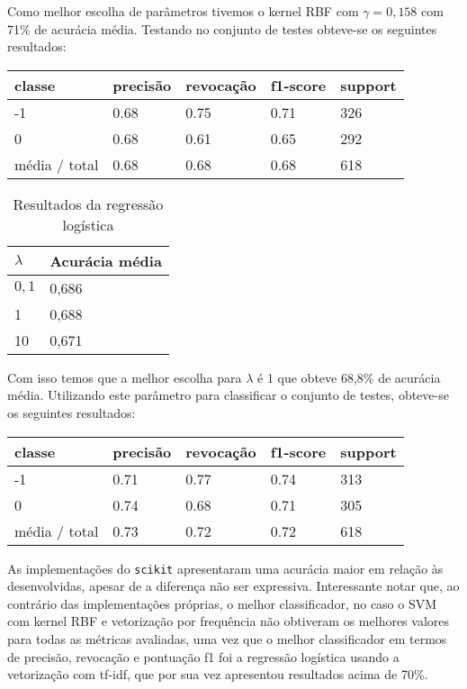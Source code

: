 Como melhor escolha de parâmetros tivemos o kernel RBF com $\gamma = 0,158$ com 71\% de
acurácia média. Testando no conjunto de testes obteve-se os seguintes resultados:

\begin{table}[H]
	\centering
		\begin{tabular}{l | l | l | l | l}
		\hline
		classe  	&	precisão  &  revocação &  f1-score &  support \\
		\hline
		 -1    &   0.68   &   0.75   &   0.71   &    326 \\
		 \hline
          0    &   0.68   &   0.61   &   0.65   &    292 \\
		\hline
		média / total   &    0.68   &   0.68   &   0.68   &    618 \\
		\hline
	\end{tabular}
\end{table}

\begin{table}[H]
	\centering
	\caption{Resultados da regressão logística}
	\begin{tabular}{l l}
		\hline
		$\lambda$ & Acurácia média \\
		\hline
		$0,1$ & 0,686 \\
		\hline
		1 & 0,688 \\
		\hline
		10 & 0,671 \\
	\end{tabular}
\end{table}


Com isso temos que a melhor escolha para $\lambda$ é 1 que obteve 68,8\% de acurácia média.
Utilizando este parâmetro para classificar o conjunto de testes, obteve-se os seguintes resultados:

\begin{table}[H]
	\centering
		\begin{tabular}{l | l | l | l | l}
		\hline
		classe  	&	precisão  &  revocação &  f1-score &  support \\
		\hline
		 -1    &   0.71   &   0.77   &   0.74   &    313 \\
		 \hline
          0    &   0.74   &   0.68   &   0.71   &    305 \\
		\hline
		média / total   &    0.73   &   0.72   &   0.72   &    618 \\
		\hline
	\end{tabular}
\end{table}

As implementações do \texttt{scikit} apresentaram uma acurácia maior em relação às
desenvolvidas, apesar de a diferença não ser expressiva. Interessante notar que,
ao contrário das implementações próprias, o melhor classificador, no caso o SVM
com kernel RBF e vetorização por frequência não obtiveram os melhores valores para
todas as métricas avaliadas, uma vez que o melhor classificador em termos de
precisão, revocação e pontuação f1 foi a regressão logística usando a vetorização
com tf-idf, que por sua vez apresentou resultados acima de 70\%.

